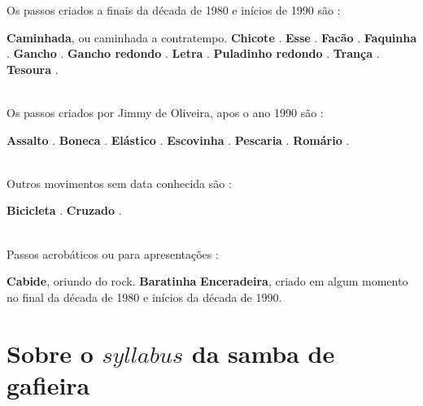 Os passos criados a finais da década de 1980 e inícios de 1990 são \cite[pp. 143]{perna2002samba}:
\begin{tasks}
\task \textbf{Caminhada}, ou caminhada a contratempo.
\task \textbf{Chicote} .
\task \textbf{Esse} .
\task \textbf{Facão} .
\task \textbf{Faquinha} .
\task \textbf{Gancho} .
\task \textbf{Gancho redondo} .
\task \textbf{Letra} .
\task \textbf{Puladinho redondo} .
\task \textbf{Trança} .
\task \textbf{Tesoura} .
\end{tasks}~\\


Os passos criados por Jimmy de Oliveira, apos o ano 1990 são \cite{sambafunkeadoJimmyDeOliveiraPart1}: 
\begin{tasks}
\task \textbf{Assalto} . 
\task \textbf{Boneca} .
\task \textbf{Elástico} .
\task \textbf{Escovinha} .
\task \textbf{Pescaria} .
\task \textbf{Romário} .
\end{tasks}~\\


Outros movimentos sem data conhecida são \cite[pp. 143]{perna2002samba}:
\begin{tasks}
\task \textbf{Bicicleta} .
\task \textbf{Cruzado} .
\end{tasks}~\\


Passos acrobáticos ou para apresentações \cite[pp. 142-143]{perna2002samba}:
\begin{tasks}
\task \textbf{Cabide},  oriundo do rock.
\task \textbf{Baratinha} 
\task \textbf{Enceradeira},  criado em algum momento no final da década de 1980 e inícios da década de 1990.
\end{tasks}


\section{Sobre o $syllabus$ da samba de gafieira}

